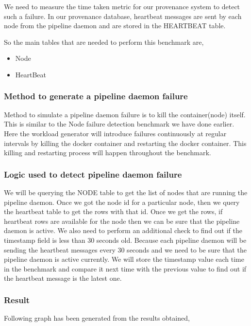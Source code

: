We need to measure the time taken metric for our provenance system to detect such a failure. In our provenance database, heartbeat messages are sent by each node from the pipeline daemon and are stored in the HEARTBEAT table.

So the main tables that are needed to perform this benchmark are,
    \begin{itemize}
        \item Node
        \item HeartBeat
    \end{itemize}

\subsubsection{Method to generate a pipeline daemon failure}

Method to simulate a pipeline daemon failure is to kill the container(node) itself. This is similar to the Node failure detection benchmark we have done earlier. Here the workload generator will introduce failures continuously at regular intervals by killing the docker container and restarting the docker container. This killing and restarting process will happen throughout the benchmark.

\subsubsection{Logic used to detect pipeline daemon failure}

We will be querying the NODE table to get the list of nodes that are running the pipeline daemon. Once we got the node id for a particular node, then we query the heartbeat table to get the rows with that id. 
Once we get the rows, if heartbeat rows are available for the node then we can be sure that the pipeline daemon is active. We also need to perform an additional check to find out if the timestamp field is less than 30 seconds old. Because each pipeline daemon will be sending the heartbeat messages every 30 seconds and we need to be sure that the pipeline daemon is active currently. We will store the timestamp value each time in the benchmark and compare it next time with the previous value to find out if the heartbeat message is the latest one.

\subsubsection{Result}

Following graph has been generated from the results obtained,

